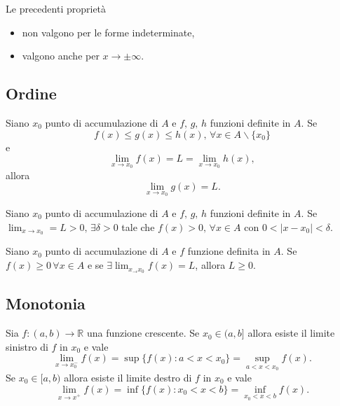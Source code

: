 Le precedenti proprietà
\begin{itemize}
    \item non valgono per le forme indeterminate,
    \item valgono anche per $x\rightarrow\pm\infty$.
\end{itemize}

\subsection{Ordine}

\begin{theorem}\label{th:dei_carabinieri_2}
    Siano $x_0$ punto di accumulazione di $A$ e $f,\, g,\, h$ funzioni definite in $A$. Se
    \begin{equation*}
    	f(x)\leq g(x)\leq h(x),\, \forall x\in A\backslash\{x_0\}
    \end{equation*}
    e
    \begin{equation*}
    	\lim_{x\rightarrow x_0}f(x)=L=\lim_{x\rightarrow x_0} h(x),
    \end{equation*}
    allora
    \begin{equation*}
        \lim_{x\rightarrow x_0} g(x)=L.
    \end{equation*}
\end{theorem}

\begin{theorem}
    Siano $x_0$ punto di accumulazione di $A$ e $f,\, g,\, h$ funzioni definite in $A$. Se $\lim_{x\rightarrow x_0}=L>0,\, \exists\delta>0$ tale che $f(x)>0,\, \forall x\in A$ con $0<|x-x_0|<\delta$.
\end{theorem}

\begin{theorem}
    Siano $x_0$ punto di accumulazione di $A$ e $f$ funzione definita in $A$.
    Se $f(x)\geq 0\, \forall x\in A$ e se $\exists\lim_{x_\rightarrow x_0}f(x)=L$, allora $L\geq 0$.
\end{theorem}

\subsection{Monotonia}
\begin{proposition}\label{prop:monotonia_limiti}
    Sia $f\colon (a,b)\rightarrow\mathbb R$ una funzione crescente.
    Se $x_0\in(a,b]$ allora esiste il limite sinistro di $f$ in $x_0$ e vale
    \begin{equation*}
        \lim_{x\rightarrow x_0^-}f(x)=\sup\{f(x)\colon a<x<x_0\}=\underset{a<x<x_0}{\sup} f(x).
    \end{equation*}
    Se $x_0\in[a,b)$ allora esiste il limite destro di $f$ in $x_0$ e vale
    \begin{equation*}
        \lim_{x\rightarrow x^+}f(x)=\inf\{f(x)\colon x_0<x<b\}=\underset{x_0<x<b}{\inf}f(x).
    \end{equation*}
\end{proposition}

